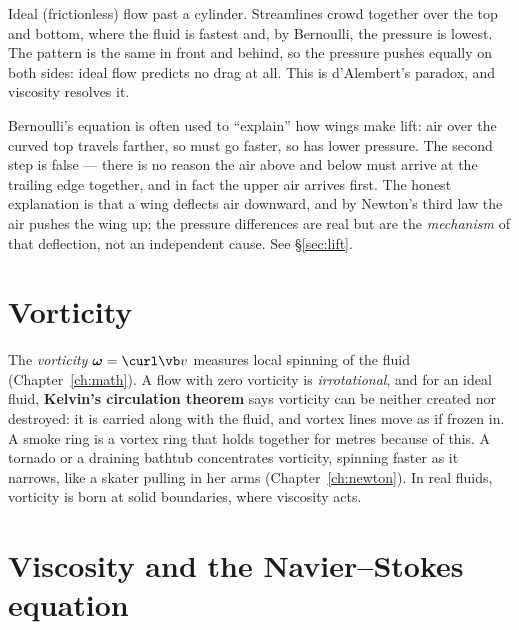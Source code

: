 \begin{center}
\begin{minipage}{\linewidth}

{\small Ideal (frictionless) flow past a cylinder. Streamlines crowd together over the top and bottom, where the fluid is fastest and, by Bernoulli, the pressure is lowest. The pattern is the same in front and behind, so the pressure pushes equally on both sides: ideal flow predicts no drag at all. This is d'Alembert's paradox, and viscosity resolves it.}
\end{minipage}
\end{center}

\begin{remark}
Bernoulli's equation is often used to ``explain'' how wings make lift: air over the curved top travels farther, so must go faster, so has lower pressure. The second step is false --- there is no reason the air above and below must arrive at the trailing edge together, and in fact the upper air arrives first. The honest explanation is that a wing deflects air downward, and by Newton's third law the air pushes the wing up; the pressure differences are real but are the \emph{mechanism} of that deflection, not an independent cause. See \S\ref{sec:lift}.
\end{remark}

\section{Vorticity}

The \emph{vorticity} $\boldsymbol\omega = \curl\vb v$ measures local spinning of the fluid (Chapter~\ref{ch:math}). A flow with zero vorticity is \emph{irrotational}, and for an ideal fluid, \textbf{Kelvin's circulation theorem} says vorticity can be neither created nor destroyed: it is carried along with the fluid, and vortex lines move as if frozen in. A smoke ring is a vortex ring that holds together for metres because of this. A tornado or a draining bathtub concentrates vorticity, spinning faster as it narrows, like a skater pulling in her arms (Chapter~\ref{ch:newton}). In real fluids, vorticity is born at solid boundaries, where viscosity acts.

\section{Viscosity and the Navier--Stokes equation}

